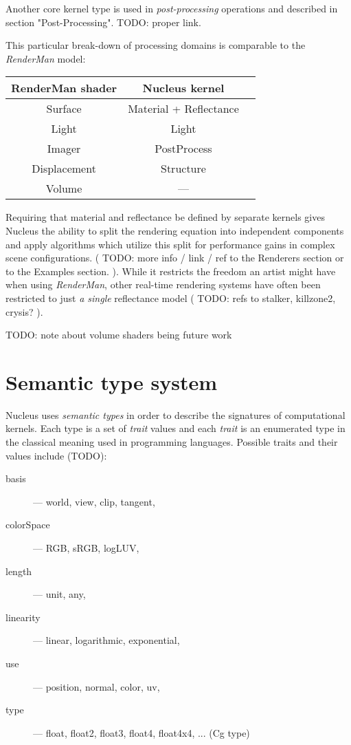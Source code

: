 Another core kernel type is used in \emph{post-processing} operations and described in section "Post-Processing". TODO: proper link.

This particular break-down of processing domains is comparable to the \emph{RenderMan} model:

\begin{center}
\begin{tabular}{ | c | c | c | }
\hline
RenderMan shader & Nucleus kernel \\
\hline
Surface & Material + Reflectance \\
Light & Light \\
Imager & PostProcess \\
Displacement & Structure \\
Volume & --- \\
\hline
\end{tabular}
\end{center}


Requiring that material and reflectance be defined by separate kernels gives Nucleus the ability to split the rendering equation into independent components and apply algorithms which utilize this split for performance gains in complex scene configurations. ( TODO: more info / link / ref to the Renderers section or to the Examples section. ). While it restricts the freedom an artist might have when using \emph{RenderMan}, other real-time rendering systems have often been restricted to just \emph{a single} reflectance model ( TODO: refs to stalker, killzone2, crysis? ).

TODO: note about volume shaders being future work

\section{Semantic type system}

Nucleus uses \emph{semantic types} in order to describe the signatures of computational kernels. Each type is a set of \emph{trait} values and each \emph{trait} is an enumerated type in the classical meaning used in programming languages. Possible traits and their values include (TODO):
\begin{description}
\item[basis] --- world, view, clip, tangent,
\item[colorSpace] --- RGB, sRGB, logLUV,
\item[length] --- unit, any,
\item[linearity] --- linear, logarithmic, exponential,
\item[use] --- position, normal, color, uv,
\item[type] --- float, float2, float3, float4, float4x4, ... (Cg type)
\end{description}

